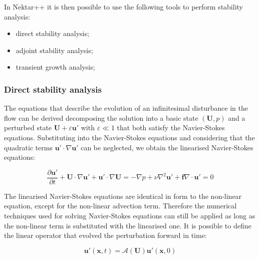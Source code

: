In Nektar++ it is then possible to use the following tools to perform stability analysis:

\begin{itemize}
\item direct stability analysis;
\item adjoint stability analysis;
\item  transient growth analysis;
\end{itemize}

\subsubsection{Direct stability analysis}


The equations that describe the evolution of an infinitesimal disturbance in the
flow can be derived decomposing the solution into a basic state $(\mathbf{U},
p)$ and a perturbed state  $\mathbf{U}+\varepsilon \mathbf{u'}$ with
$\varepsilon \ll 1$ that both satisfy the Navier-Stokes equations. Substituting
into the Navier-Stokes equations and considering that the quadratic terms $\mathbf{u'} \cdot \nabla \mathbf{u'}$ can be neglected, we obtain the linearised Navier-Stokes equations:

\begin{subequations}
\begin{equation}
  \frac{\partial \mathbf{u'}}{\partial t} + \mathbf{U} \cdot  \nabla \mathbf{u'}+\mathbf{u'} \cdot \nabla \mathbf{U} = -\nabla p + \nu \nabla^2 \mathbf{u'} + \mathbf{f}
\end{equation}

\begin{equation}
    \nabla \cdot \mathbf{u'} = 0
\end{equation}

\end{subequations}



The linearised Navier-Stokes equations are identical in form to the non-linear equation, except for the non-linear advection term. Therefore the numerical techniques used for solving Navier-Stokes equations can still be applied as long as the non-linear term is substituted with the linearised one. It is possible to define the linear operator that evolved the perturbation forward in time:

\begin{equation}
   \mathbf{u'}(\mathbf{x},t)=\mathcal{A}(\mathbf{U})\mathbf{u'}(\mathbf{x},0)
\end{equation}

